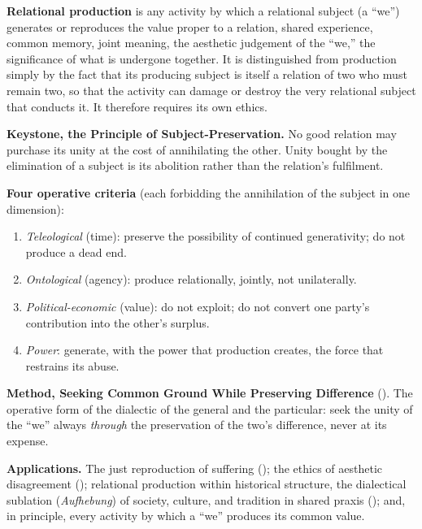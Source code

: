 \begin{recapbox}
\textbf{Relational production} is any activity by which a relational subject (a ``we'') generates or reproduces the value proper to a relation, shared experience, common memory, joint meaning, the aesthetic judgement of the ``we,'' the significance of what is undergone together. It is distinguished from production simply by the fact that its producing subject is itself a relation of two who must remain two, so that the activity can damage or destroy the very relational subject that conducts it. It therefore requires its own ethics.

\medskip
\noindent\textbf{Keystone, the Principle of Subject-Preservation.} No good relation may purchase its unity at the cost of annihilating the other. Unity bought by the elimination of a subject is its abolition rather than the relation's fulfilment.

\medskip
\noindent\textbf{Four operative criteria} (each forbidding the annihilation of the subject in one dimension):
\begin{enumerate}
\item \emph{Teleological} (time): preserve the possibility of continued generativity; do not produce a dead end.
\item \emph{Ontological} (agency): produce relationally, jointly, not unilaterally.
\item \emph{Political-economic} (value): do not exploit; do not convert one party's contribution into the other's surplus.
\item \emph{Power}: generate, with the power that production creates, the force that restrains its abuse.
\end{enumerate}

\medskip
\noindent\textbf{Method, Seeking Common Ground While Preserving Difference} (). The operative form of the dialectic of the general and the particular: seek the unity of the ``we'' always \emph{through} the preservation of the two's difference, never at its expense.

\medskip
\noindent\textbf{Applications.} The just reproduction of suffering (); the ethics of aesthetic disagreement (); relational production within historical structure, the dialectical sublation (\emph{Aufhebung}) of society, culture, and tradition in shared praxis (); and, in principle, every activity by which a ``we'' produces its common value.
\end{recapbox}

